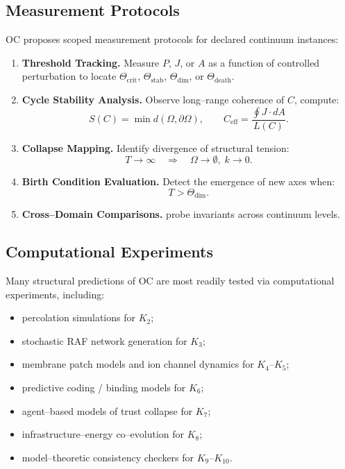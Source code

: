 \subsection{Measurement Protocols}

OC proposes scoped measurement protocols for declared continuum instances:

\begin{enumerate}
    \item \textbf{Threshold Tracking.}
          Measure $P$, $J$, or $A$ as a function of controlled perturbation to
          locate $\Theta_{\mathrm{crit}}$, $\Theta_{\mathrm{stab}}$,
          $\Theta_{\mathrm{dim}}$, or $\Theta_{\mathrm{death}}$.

    \item \textbf{Cycle Stability Analysis.}
          Observe long–range coherence of $C$, compute:
          \[
             S(C)=\min d(\Omega,\partial\Omega),\qquad
             C_{\mathrm{eff}}=\frac{\oint J\cdot dA}{L(C)}.
          \]

    \item \textbf{Collapse Mapping.}
          Identify divergence of structural tension:
          \[
              T\to \infty \quad \Rightarrow \quad
              \Omega\to\emptyset, \; k\to 0.
          \]

    \item \textbf{Birth Condition Evaluation.}
          Detect the emergence of new axes when:
          \[
             T > \Theta_{\mathrm{dim}}.
          \]

    \item \textbf{Cross–Domain Comparisons.}
          probe invariants across continuum levels.
\end{enumerate}


\subsection{Computational Experiments}

Many structural predictions of OC are most readily tested via computational
experiments, including:

\begin{itemize}
    \item percolation simulations for $K_2$;
    \item stochastic RAF network generation for $K_3$;
    \item membrane patch models and ion channel dynamics for $K_4$–$K_5$;
    \item predictive coding / binding models for $K_6$;
    \item agent–based models of trust collapse for $K_7$;
    \item infrastructure–energy co–evolution for $K_8$;
    \item model–theoretic consistency checkers for $K_9$–$K_{10}$.
\end{itemize}

